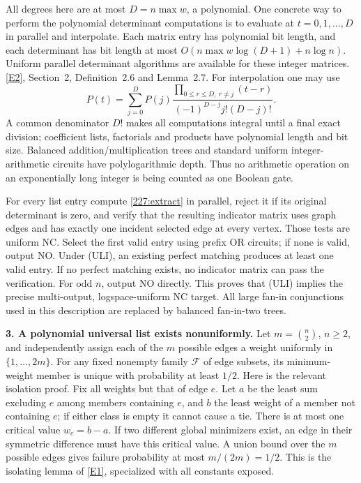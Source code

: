 \documentclass[11pt,a4paper]{article}
\newcommand{\eref}[2]{\hyperlink{extra:#1:#2}{[E#2]}}
\numberwithin{equation}{section}
\begin{document}
All degrees here are at most $D=n\max w$, a polynomial. One concrete
way to perform the polynomial determinant computations is to evaluate
at $t=0,1,\ldots,D$ in parallel and interpolate. Each matrix entry has
polynomial bit length, and each determinant has bit length at most
$O(n\max w\log(D+1)+n\log n)$. Uniform parallel determinant algorithms
are available for these integer matrices. \eref{227}{2}, Section~2,
Definition~2.6 and Lemma~2.7. For interpolation one may use
\[
 P(t)=\sum_{j=0}^{D}P(j)
       \frac{\prod_{0\le r\le D,\ r\ne j}(t-r)}
            {(-1)^{D-j}j!(D-j)!}.
\]
A common denominator $D!$ makes all computations integral until a final
exact division; coefficient lists, factorials and products have
polynomial length and bit size. Balanced addition/multiplication trees
and standard uniform integer-arithmetic circuits have polylogarithmic
depth. Thus no arithmetic operation on an exponentially long integer is
being counted as one Boolean gate.

For every list entry compute \eqref{227:extract} in parallel, reject it
if its original determinant is zero, and verify that the resulting
indicator matrix uses graph edges and has exactly one incident selected
edge at every vertex. Those tests are uniform NC. Select the first
valid entry using prefix OR circuits; if none is valid, output NO.
Under (ULI), an existing perfect matching produces at least one valid
entry. If no perfect matching exists, no indicator matrix can pass the
verification. For odd $n$, output NO directly. This proves that (ULI)
implies the precise multi-output, logspace-uniform NC target. All
large fan-in conjunctions used in this description are replaced by
balanced fan-in-two trees.

\textbf{3. A polynomial universal list exists nonuniformly.}
Let $m=\binom n2$, $n\ge2$, and independently assign each of the $m$
possible edges a weight uniformly in $\{1,\ldots,2m\}$.
For any fixed nonempty family $\mathcal F$ of edge subsets, its
minimum-weight member is unique with probability at least $1/2$.
Here is the relevant isolation proof. Fix all weights but that of edge
$e$. Let $a$ be the least sum excluding $e$ among members containing
$e$, and $b$ the least weight of a member not containing $e$; if either
class is empty it cannot cause a tie. There is at most one critical
value $w_e=b-a$. If two different global minimizers exist, an edge in
their symmetric difference must have this critical value. A union bound
over the $m$ possible edges gives failure probability at most
$m/(2m)=1/2$. This is the isolating lemma of \eref{227}{1}, specialized
with all constants exposed.
\end{document}
